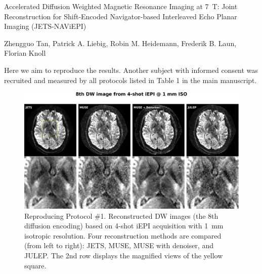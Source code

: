 \documentclass[a4paper,11pt,twoside]{report}
\begin{document}

    \begin{center}
        {\Large Accelerated Diffusion Weighted Magnetic Resonance Imaging at 7~T: Joint Reconstruction for Shift-Encoded Navigator-based Interleaved Echo Planar Imaging (JETS-NAViEPI)}
    \end{center}

    \begin{center}
        Zhengguo Tan, Patrick A. Liebig, Robin M. Heidemann, Frederik B. Laun, Florian Knoll
    \end{center}

    \vspace{2em}

    Here we aim to reproduce the results.
    Another subject with informed consent was recruited and
    measured by all protocols
    listed in Table 1 in the main manuscript.

    \newpage


    \begin{figure}[h]
        \includegraphics[width=\textwidth]{../figures/supp_fig1.png}
        \caption{Reproducing Protocol \#1.
        Reconstructed DW images
        (the 8th diffusion encoding)
        based on 4-shot iEPI acquisition with 1~mm isotropic resolution.
        Four reconstruction methods are compared (from left to right):
        JETS, MUSE, MUSE with denoiser, and JULEP.
        The 2nd row displays the magnified views of the yellow square.}
    \end{figure}
\end{document}
